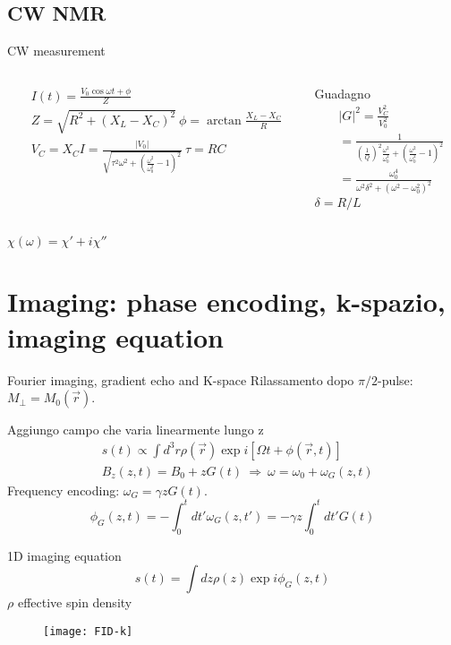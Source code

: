 \subsection{CW NMR}

\begin{frame}{CW measurement}
\begin{columns}  \begin{column}{0.5\textwidth}
\begin{align*}
&I(t)=\frac{V_0\cos{\omega t+\phi}}{Z}\\
&Z=\sqrt{R^2+(X_L-X_C)^2}\ \phi=\arctan{\frac{X_L-X_C}{R}}\\
&V_C=X_CI=\frac{|V_0|}{\sqrt{\tau^2\omega^2+(\frac{\omega^2}{\omega_0^2}-1)^2}}\ \tau=RC
\end{align*}
\end{column} \begin{column}{0.5\textwidth}
Guadagno
\begin{align*}
&|G|^2=\frac{V_C^2}{V_0^2}\\
&=\frac{1}{(\frac{1}{Q})^2 \frac{\omega^2}{\omega_0^2}+(\frac{\omega^2}{\omega_0^2}-1)^2}\\
&=\frac{\omega_0^4}{\omega^2\delta^2+(\omega^2-\omega_0^2)^2}
\end{align*}
$\delta=R/L$ 
\end{column}  \end{columns}
$\chi(\omega)=\chi'+i\chi''$
\end{frame}

\section{Imaging: phase encoding, k-spazio, imaging equation}

\begin{frame}[allowframebreaks]{Fourier imaging, gradient echo and K-space}
Rilassamento dopo $\pi/2$-pulse:$M_{\perp}=M_0(\vec{r})$.
\begin{block}{Aggiungo campo che varia linearmente lungo z}
\begin{align*}
&s(t)\propto\int d^3 r\rho(\vec{r})\exp{i[\Omega t+\phi(\vec{r},t)]}\\
&B_z(z,t)=B_0+zG(t)\ \Rightarrow\ \omega=\omega_0+\omega_G(z,t)
\end{align*}
Frequency encoding: $\omega_G=\gamma zG(t)$.
\begin{equation*}
\phi_G(z,t)=-\int_0^td t'\omega_G(z,t')=-\gamma z\int_0^td t'G(t)
\end{equation*}
\end{block}
\begin{block}{1D imaging equation}
\begin{equation*}
s(t)=\int d z\rho(z)\exp{i\phi_G(z,t)}
\end{equation*}
$\rho$ effective spin density
\end{block}
\begin{figure}[!ht]\texttt{[image: FID-k]}\label{fig:FID-k}\end{figure}
\end{frame}

